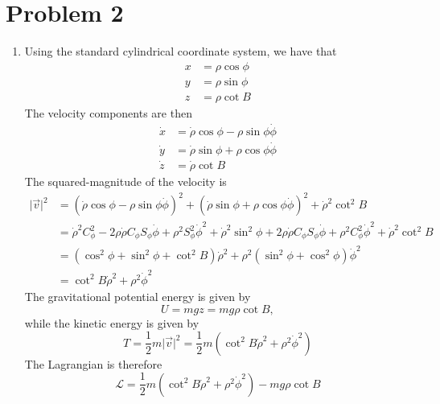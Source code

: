 \documentclass[12pt]{article}
\newcommand{\magsq}[1]{\big|#1\big|^2}
\begin{document}
\section*{Problem 2}
\begin{enumerate}[label=(\alph*)]
    \item Using the standard cylindrical coordinate system, we have that
    \begin{align*}
        x &= \rho\cos\phi \\
        y &= \rho\sin\phi \\
        z &= \rho\cot B
    \end{align*}
    The velocity components are then
    \begin{align*}
        \dot{x} &= \dot{\rho}\cos\phi - \rho\sin\phi\dot{\phi} \\
        \dot{y} &= \dot{\rho}\sin\phi + \rho\cos\phi\dot{\phi} \\
        \dot{z} &= \dot{\rho}\cot B
    \end{align*}
    The squared-magnitude of the velocity is
    \begin{align*}
        \magsq{\vec{v}} &= \left(\dot{\rho}\cos\phi - \rho\sin\phi\dot{\phi}\right)^2 + \left(\dot{\rho}\sin\phi + \rho\cos\phi\dot{\phi}\right)^2 + \dot{\rho}^2\cot^2B \\
        &= \dot{\rho}^2C_\phi^2 - 2\rho\dot{\rho}C_\phi S_\phi\dot{\phi} + \rho^2S_\phi^2\dot{\phi}^2 + \dot{\rho}^2\sin^2\phi + 2\rho\dot{\rho}C_\phi S_\phi\dot{\phi} + \rho^2C_\phi^2\dot{\phi}^2 + \dot{\rho}^2\cot^2 B \\
        &= \left(\cos^2\phi + \sin^2\phi + \cot^2 B\right)\dot{\rho}^2 + \rho^2\left(\sin^2\phi + \cos^2\phi\right)\dot{\phi}^2 \\
        &= \cot^2 B\dot{\rho}^2 + \rho^2\dot{\phi}^2
    \end{align*}
    The gravitational potential energy is given by
    \[ U = mgz = mg\rho\cot B, \]
    while the kinetic energy is given by
    \[ T = \frac{1}{2}m\magsq{\vec{v}} = \frac{1}{2}m\left(\cot^2 B\dot{\rho}^2 + \rho^2\dot{\phi}^2\right) \]
    The Lagrangian is therefore
    \[ \boxed{\mathscr{L} = \frac{1}{2}m\left(\cot^2 B\dot{\rho}^2 + \rho^2\dot{\phi}^2\right) - mg\rho\cot B} \]


\end{enumerate}
\end{document}
